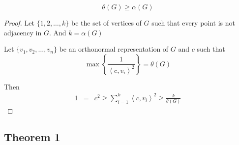 \documentclass{beamer}
\begin{document}
                  \begin{frame}
                        \begin{lemma}
                              \begin{equation}
                                    \theta(G) \geq \alpha(G)
                              \end{equation}
                        \end{lemma}

                        \pause

                        \begin{proof}
                              Let $ \{1,2,\dots,k\} $ be the set of vertices of $ G $ such that every point is not adjacency in $ G $. And $ k = \alpha(G) $
                  
                              Let $ \{v_1, v_2, \dots, v_n\} $ be an orthonormal representation of $ G $ and $ c $ such that
                              \begin{equation}
                                    \max \left\{ \frac{1}{\left<c,v_{i}\right>^2} \right\} = \theta(G)
                              \end{equation}
                                    
                              Then
                              \begin{eqnarray}
                                    1 &=& c^{2}
                                    \geq \sum_{i=1}^{k} \left<c,v_{i}\right>^{2}
                                    \geq \frac{k}{\theta(G)}
                              \end{eqnarray}
                        \end{proof}
                  \end{frame}

            \subsection{Theorem 1}
                  
\end{document}
